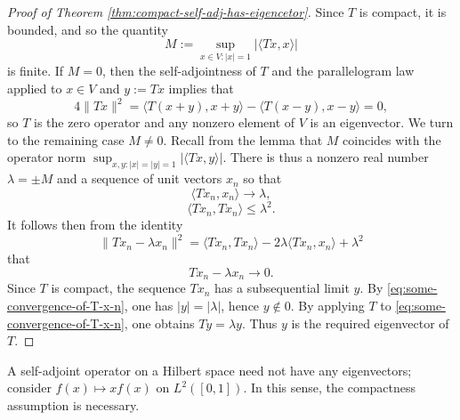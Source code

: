 \documentclass[reqno]{amsart} 
\begin{document}
\begin{proof}
[Proof of Theorem \ref{thm:compact-self-adj-has-eigencetor}]
  Since $T$ is compact, it is
  bounded, and so the quantity
  \begin{equation*}
  M := \sup_{x \in V : |x| = 1} |\langle T x, x \rangle|
  \end{equation*}
  is finite.
  If $M = 0$, then the self-adjointness
  of $T$
  and the parallelogram law applied to $x \in V$ and $y := T x$
  implies
  that
  \begin{equation*}
4 \|T x\|^2
  =
  \langle T (x+y), x+y \rangle -
  \langle T (x-y), x-y \rangle
  = 0,
\end{equation*}
  so $T$ is the zero operator
  and any nonzero element of $V$ 
  is an eigenvector.
  We turn to the remaining case $M \neq 0$.
  Recall from the lemma that $M$ coincides with the operator norm
  $\sup_{x,y: |x|=|y| = 1} |\langle T x, y \rangle|$.
  There
  is thus a nonzero real number $\lambda = \pm M$ and a sequence
  of unit vectors $x_n$ so that
  \begin{equation*}
\langle T x_n, x_n  \rangle \rightarrow \lambda,
\end{equation*}
  \begin{equation*}
\langle T x_n, T x_n \rangle \leq \lambda^2.
\end{equation*}
  It follows then from the identity
  \begin{equation*}
  \|T x_n - \lambda x_n\|^2
  = \langle T x_n, T x_n \rangle
  - 2 \lambda  \langle T x_n, x_n \rangle
  + \lambda^2
  \end{equation*}
  that
  \begin{equation}\label{eq:some-convergence-of-T-x-n}
    T x_n - \lambda x_n \rightarrow 0.
  \end{equation}
  Since $T$ is compact, the sequence $T x_n$ has a subsequential
  limit $y$.
  By \eqref{eq:some-convergence-of-T-x-n},
  one has
  $|y| = |\lambda|$, hence $y \notin 0$.
  By applying $T$ to \eqref{eq:some-convergence-of-T-x-n},
  one obtains
  $T y = \lambda y$.
  Thus $y$ is the required eigenvector of $T$.
\end{proof}

\begin{remark}
  A
  self-adjoint operator on a Hilbert space need not have any
  eigenvectors; consider $f(x) \mapsto x f(x)$ on $L^2([0,1])$.
  In this sense, the compactness assumption is necessary.
\end{remark}
\end{document}

